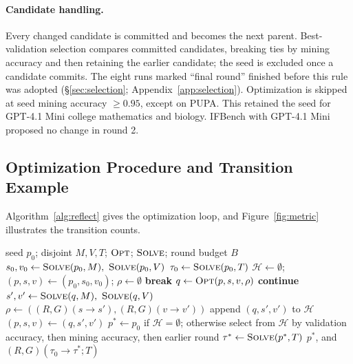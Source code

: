 \documentclass[11pt]{article}
\begin{document}
\paragraph{Candidate handling.}
Every changed candidate is committed and becomes the next parent. Best-validation selection compares committed
candidates, breaking ties by mining accuracy and then retaining the earlier candidate; the seed is excluded once a
candidate commits. The eight runs marked ``final round'' finished before this rule was adopted (\S\ref{sec:selection};
Appendix~\ref{app:selection}). Optimization is skipped at seed mining accuracy $\geq 0.95$, except on PUPA. This
retained the seed for GPT-4.1 Mini college mathematics and biology. IFBench with GPT-4.1 Mini proposed no change in
round 2.

\subsection{Optimization Procedure and Transition Example}
\label{app:algorithm}
Algorithm~\ref{alg:reflect} gives the optimization loop, and Figure~\ref{fig:metric} illustrates the transition counts.

\begin{algorithm}[htbp]
\caption{RFDPO optimization with edit-effect feedback}
\label{alg:reflect}
\small
\begin{algorithmic}[1]
\Require seed $p_0$; disjoint $M,V,T$; $\textsc{Opt}$; $\textsc{Solve}$; round budget $B$
\State $s_0,v_0 \gets \textsc{Solve}(p_0,M),\ \textsc{Solve}(p_0,V)$
\State $\tau_0 \gets \textsc{Solve}(p_0,T)$ 
\State $\mathcal{H}\gets\emptyset$; $(p,s,v)\gets(p_0,s_0,v_0)$; $\rho\gets\emptyset$
   \State \textbf{break} \EndIf
  \State $q\gets\textsc{Opt}(p,s,v,\rho)$ 
   \State \textbf{continue} \EndIf
  \State $s',v'\gets\textsc{Solve}(q,M),\ \textsc{Solve}(q,V)$
  \State $\rho\gets((R,G)(s\!\to\!s'),(R,G)(v\!\to\!v'))$
  \State append $(q,s',v')$ to $\mathcal{H}$ 
  \State $(p,s,v)\gets(q,s',v')$
\EndFor
\State $p^*\gets p_0$ if $\mathcal{H}=\emptyset$; otherwise select from $\mathcal{H}$
\Statex \hspace{\algorithmicindent} by validation accuracy, then mining accuracy,
\Statex \hspace{\algorithmicindent} then earlier round
\State $\tau^* \gets \textsc{Solve}(p^*,T)$ 
\State \Return $p^*$, and $(R,G)(\tau_0\!\to\!\tau^*;T)$
\end{algorithmic}
\end{algorithm}
\end{document}
